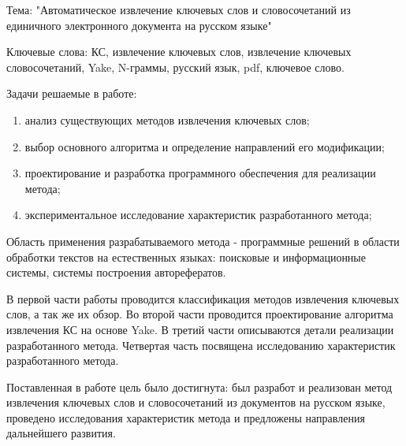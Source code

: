 \begin{essay}{}
Тема: "Автоматическое извлечение ключевых слов и словосочетаний из единичного электронного документа на русском языке"

Ключевые слова: КС, извлечение ключевых слов, извлечение ключевых словосочетаний, Yake, N-граммы, русский язык, pdf, ключевое слово.

Задачи решаемые в работе:
\begin{enumerate}
	\item анализ существующих методов извлечения ключевых слов;
	\item выбор основного алгоритма и определение направлений его модификации;
	\item проектирование и разработка программного обеспечения для реализации метода;
	\item экспериментальное исследование характеристик разработанного метода;
\end{enumerate}

Область применения разрабатываемого метода -  программные решений в области обработки текстов на естественных языках: поисковые и информационные системы, системы построения авторефератов.

В первой части работы проводится классификация методов извлечения ключевых слов, а так же их обзор.
Во второй части проводится проектирование алгоритма извлечения КС на основе Yake.
В третий части описываются детали реализации разработанного метода.
Четвертая часть посвящена исследованию характеристик разработанного метода.

Поставленная в работе цель было достигнута: был разработ и реализован метод извлечения ключевых слов и словосочетаний из документов на русском языке, проведено исследования характеристик метода и предложены направления дальнейшего развития.
\end{essay}





